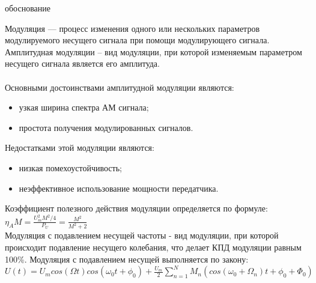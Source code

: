 \documentclass[a4paper,12pt]{article}
\begin{document}
{ обоснование}

Модуляция — процесс изменения одного или нескольких параметров модулируемого несущего сигнала при помощи модулирующего сигнала. Амплитудная модуляции -- вид модуляции, при которой изменяемым параметром несущего сигнала является его амплитуда.\\\\
Основными достоинствами амплитудной модуляции являются:
\begin{itemize}
\item узкая ширина спектра АМ сигнала;
\item простота получения модулированных сигналов.\\
\end{itemize}
Недостатками этой модуляции являются:
\begin{itemize}
\item низкая помехоустойчивость;
\item неэффективное использование мощности передатчика.\\
\end{itemize}

Коэффициент полезного действия модуляции определяется по формуле:\\

$\eta_AM=\frac{U_m^2M^2/4}{P_U}=\frac{M^2}{M^2+2}$\\

Модуляция с подавлением несущей частоты - вид модуляции, при которой происходит подавление несущего колебания, что делает КПД модуляции равным 100\%. Модуляция с подавлением несущей выполняется по закону:\\

$U(t)=U_mcos(\Omega t)cos(\omega_0t+\phi_0)+\frac{U_m}{2}\sum_{n=1}^{N}M_n(cos(\omega_0+\Omega_n)t+\phi_0+\Phi_0)$\\
\newpage
\end{document}
